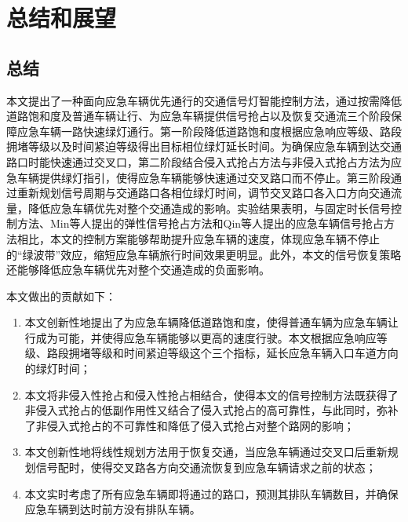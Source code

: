 \chapter{总结和展望}

\section{总结}
本文提出了一种面向应急车辆优先通行的交通信号灯智能控制方法，通过按需降低道路饱和度及普通车辆让行、为应急车辆提供信号抢占以及恢复交通流三个阶段保障应急车辆一路快速绿灯通行。第一阶段降低道路饱和度根据应急响应等级、路段拥堵等级以及时间紧迫等级得出目标相位绿灯延长时间。为确保应急车辆到达交通路口时能快速通过交叉口，第二阶段结合侵入式抢占方法与非侵入式抢占方法为应急车辆提供绿灯指引，使得应急车辆能够快速通过交叉路口而不停止。第三阶段通过重新规划信号周期与交通路口各相位绿灯时间，调节交叉路口各入口方向交通流量，降低应急车辆优先对整个交通造成的影响。实验结果表明，与固定时长信号控制方法、Min等人\cite{min}提出的弹性信号抢占方法和Qin等人\cite{qin_control_2012}提出的应急车辆信号抢占方法相比，本文的控制方案能够帮助提升应急车辆的速度，体现应急车辆不停止的“绿波带”效应，缩短应急车辆旅行时间效果更明显。此外，本文的信号恢复策略还能够降低应急车辆优先对整个交通造成的负面影响。

本文做出的贡献如下：
\begin{enumerate}
	\item 本文创新性地提出了为应急车辆降低道路饱和度，使得普通车辆为应急车辆让行成为可能，并使得应急车辆能够以更高的速度行驶。本文根据应急响应等级、路段拥堵等级和时间紧迫等级这个三个指标，延长应急车辆入口车道方向的绿灯时间；
	\item 本文将非侵入性抢占和侵入性抢占相结合，使得本文的信号控制方法既获得了非侵入式抢占的低副作用性又结合了侵入式抢占的高可靠性，与此同时，弥补了非侵入式抢占的不可靠性和降低了侵入式抢占对整个路网的影响；
	\item 本文创新性地将线性规划方法用于恢复交通，当应急车辆通过交叉口后重新规划信号配时，使得交叉路各方向交通流恢复到应急车辆请求之前的状态；
	\item 本文实时考虑了所有应急车辆即将通过的路口，预测其排队车辆数目，并确保应急车辆到达时前方没有排队车辆。
\end{enumerate}

